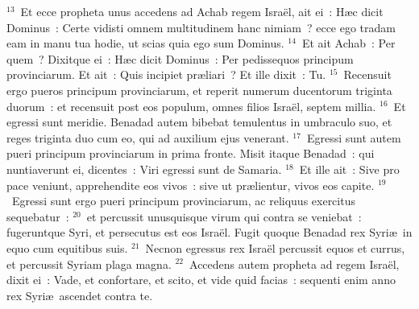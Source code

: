 ${}^{13}$~Et ecce propheta unus accedens ad Achab regem Isra\"el, ait ei~: H\ae c dicit Dominus~: Certe vidisti omnem multitudinem hanc nimiam~? ecce ego tradam eam in manu tua hodie, ut scias quia ego sum Dominus.
${}^{14}$~Et ait Achab~: Per quem~? Dixitque ei~: H\ae c dicit Dominus~: Per pedissequos principum provinciarum. Et ait~: Quis incipiet pr\ae liari~? Et ille dixit~: Tu.
${}^{15}$~Recensuit ergo pueros principum provinciarum, et reperit numerum ducentorum triginta duorum~: et recensuit post eos populum, omnes filios Isra\"el, septem millia.
${}^{16}$~Et egressi sunt meridie. Benadad autem bibebat temulentus in umbraculo suo, et reges triginta duo cum eo, qui ad auxilium ejus venerant.
${}^{17}$~Egressi sunt autem pueri principum provinciarum in prima fronte. Misit itaque Benadad~: qui nuntiaverunt ei, dicentes~: Viri egressi sunt de Samaria.
${}^{18}$~Et ille ait~: Sive pro pace veniunt, apprehendite eos vivos~: sive ut pr\ae lientur, vivos eos capite.
${}^{19}$~Egressi sunt ergo pueri principum provinciarum, ac reliquus exercitus sequebatur~:
${}^{20}$~et percussit unusquisque virum qui contra se veniebat~: fugeruntque Syri, et persecutus est eos Isra\"el. Fugit quoque Benadad rex Syri\ae\ in equo cum equitibus suis.
${}^{21}$~Necnon egressus rex Isra\"el percussit equos et currus, et percussit Syriam plaga magna.
${}^{22}$~Accedens autem propheta ad regem Isra\"el, dixit ei~: Vade, et confortare, et scito, et vide quid facias~: sequenti enim anno rex Syri\ae\ ascendet contra te.



